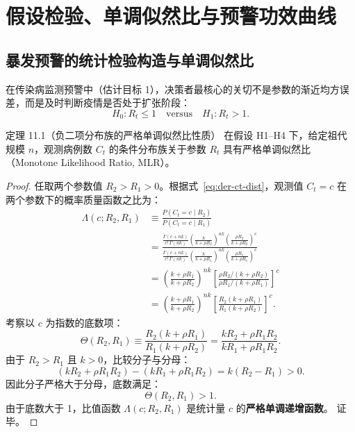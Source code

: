 \section{假设检验、单调似然比与预警功效曲线}
\label{sec:part11}

\subsection{暴发预警的统计检验构造与单调似然比}

在传染病监测预警中（估计目标 1），决策者最核心的关切不是参数的渐近均方误差，而是及时判断疫情是否处于扩张阶段：
\begin{equation}
  H_0\colon R_t \le 1 \quad \text{versus} \quad H_1\colon R_t > 1.
  \label{eq:hypo-def}
\end{equation}

\begin{theorembox}{定理 11.1（负二项分布族的严格单调似然比性质）}
在假设 H1--H4 下，给定祖代规模 $n$，观测病例数 $C_t$ 的条件分布族关于参数 $R_t$ 具有严格单调似然比（Monotone Likelihood Ratio, MLR）。
\end{theorembox}

\begin{proof}
任取两个参数值 $R_2 > R_1 > 0$。根据式~\eqref{eq:der-ct-dist}，观测值 $C_t = c$ 在两个参数下的概率质量函数之比为：
\begin{align}
  \Lambda(c; R_2, R_1) &\equiv \frac{P(C_t = c \mid R_2)}{P(C_t = c \mid R_1)} \nonumber \\
  &= \frac{\frac{\Gamma(c+nk)}{c!\,\Gamma(nk)} \left(\frac{k}{k+\rho R_2}\right)^{nk} \left(\frac{\rho R_2}{k+\rho R_2}\right)^c}{\frac{\Gamma(c+nk)}{c!\,\Gamma(nk)} \left(\frac{k}{k+\rho R_1}\right)^{nk} \left(\frac{\rho R_1}{k+\rho R_1}\right)^c} \nonumber \\
  &= \left( \frac{k+\rho R_1}{k+\rho R_2} \right)^{nk} \left[ \frac{\rho R_2 / (k+\rho R_2)}{\rho R_1 / (k+\rho R_1)} \right]^c \nonumber \\
  &= \left( \frac{k+\rho R_1}{k+\rho R_2} \right)^{nk} \left[ \frac{R_2(k+\rho R_1)}{R_1(k+\rho R_2)} \right]^c.
  \label{eq:lr-ratio}
\end{align}
考察以 $c$ 为指数的底数项：
\begin{equation}
  \Theta(R_2, R_1) \equiv \frac{R_2(k+\rho R_1)}{R_1(k+\rho R_2)} = \frac{k R_2 + \rho R_1 R_2}{k R_1 + \rho R_1 R_2}.
\end{equation}
由于 $R_2 > R_1$ 且 $k > 0$，比较分子与分母：
\begin{equation}
  (k R_2 + \rho R_1 R_2) - (k R_1 + \rho R_1 R_2) = k(R_2 - R_1) > 0.
\end{equation}
因此分子严格大于分母，底数满足：
\begin{equation}
  \Theta(R_2, R_1) > 1.
\end{equation}
由于底数大于 1，比值函数 $\Lambda(c; R_2, R_1)$ 是统计量 $c$ 的\textbf{严格单调递增函数}。
证毕。
\end{proof}

